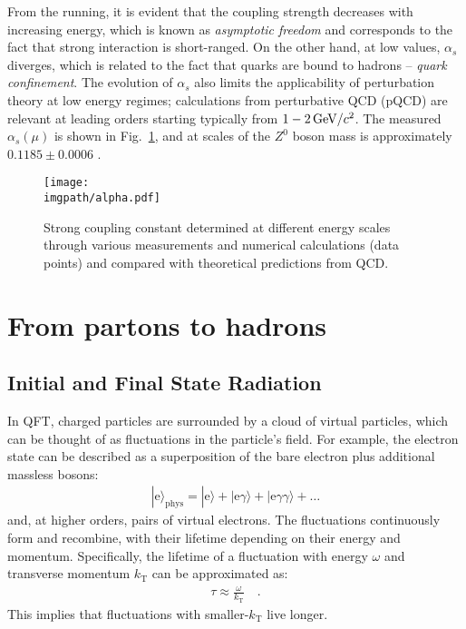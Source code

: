 From the running, it is evident that the coupling strength decreases with increasing energy, which is known as \textit{asymptotic freedom} \cite{politzerReliablePerturbativeResults1973,grossAsymptoticallyFreeGauge1973} and corresponds to the fact that strong interaction is short-ranged. On the other hand, at low values, $\alpha_s$ diverges, which is related to the fact that quarks are bound to hadrons -- \textit{quark confinement}. The evolution of $\alpha_s$ also limits the applicability of perturbation theory at low energy regimes; calculations from perturbative QCD (pQCD) are relevant at leading orders starting typically from $1-2 \text{\,GeV/$c^2$}$. The measured $\alpha_s(\mu)$ is shown in Fig.~\ref{fig:intro:alpha}, and at scales of the $Z^0$ boson mass is approximately $0.1185 \pm 0.0006$ \cite{dissertoriDeterminationStrongCoupling2016, particledatagroupReviewParticlePhysics2022}.

\begin{figure}[H]
\texttt{[image: \\imgpath/alpha.pdf]}
\caption{Strong coupling constant determined at different energy scales through various measurements and numerical calculations (data points) and compared with theoretical predictions from QCD. \cite{dissertoriDeterminationStrongCoupling2016}}
\label{fig:intro:alpha}
\end{figure}

\section{From partons to hadrons}

\subsection{Initial and Final State Radiation}

In QFT, charged particles are surrounded by a cloud of virtual particles, which can be thought of as fluctuations in the particle's field. For example, the electron state can be described as a superposition of the bare electron plus additional massless bosons:
\begin{align}
|\mathrm{e}\rangle_\mathrm{phys} = |\mathrm{e}\rangle + |\mathrm{e}\gamma\rangle + |\mathrm{e}\gamma\gamma\rangle + \ldots
\end{align}
and, at higher orders, pairs of virtual electrons. The fluctuations continuously form and recombine, with their lifetime depending on their energy and momentum. Specifically, the lifetime of a fluctuation with energy $\omega$ and transverse momentum $k_\mathrm{T}$ can be approximated as:
\begin{align}
\tau \approx \frac{\omega}{k_\mathrm{T}} \quad .
\end{align}
This implies that fluctuations with smaller-$k_\mathrm{T}$ live longer. \cite{prestelParticlePhysicsPhenomenology}

